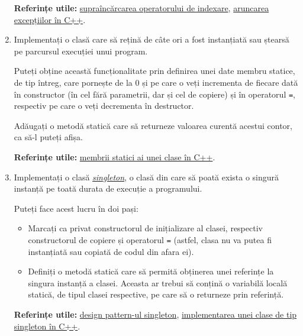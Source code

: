 \begin{enumerate}
    \textbf{Referințe utile:} \href{https://www.geeksforgeeks.org/overloading-subscript-or-array-index-operator-in-c/}{supraîncărcarea operatorului de indexare}, \href{https://cplusplus.com/doc/tutorial/exceptions/}{aruncarea excepțiilor în C++}.

    \item Implementați o clasă care să rețină de câte ori a fost instanțiată sau ștearsă pe parcursul execuției unui program.
    
    Puteți obține această funcționalitate prin definirea unei date membru statice, de tip întreg, care pornește de la \(0\) și pe care o veți incrementa de fiecare dată în constructor (în cel fără parametrii, dar și cel de copiere) și în operatorul \texttt{=}, respectiv pe care o veți decrementa în destructor.

    Adăugați o metodă statică care să returneze valoarea curentă acestui contor, ca să-l puteți afișa.

    \textbf{Referințe utile:} \href{https://www.tutorialspoint.com/cplusplus/cpp_static_members.htm}{membrii statici ai unei clase în C++}.

    \item Implementați o clasă \href{https://refactoring.guru/design-patterns/singleton/cpp/example}{\emph{singleton}}, o clasă din care să poată exista o singură instanță pe toată durata de execuție a programului.

    Puteți face acest lucru în doi pași:
    \begin{itemize}
        \item Marcați ca privat constructorul de inițializare al clasei, respectiv constructorul de copiere și operatorul \texttt{=} (astfel, clasa nu va putea fi instanțiată sau copiată de codul din afara ei).

        \item Definiți o metodă statică care să permită obținerea unei referințe la singura instanță a clasei. Aceasta ar trebui să conțină o variabilă locală statică, de tipul clasei respective, pe care să o returneze prin referință.
    \end{itemize}

    \textbf{Referințe utile:} \href{https://refactoring.guru/design-patterns/singleton}{design pattern-ul singleton}, \href{https://www.geeksforgeeks.org/implementation-of-singleton-class-in-cpp/}{implementarea unei clase de tip singleton în C++}.
\end{enumerate}
